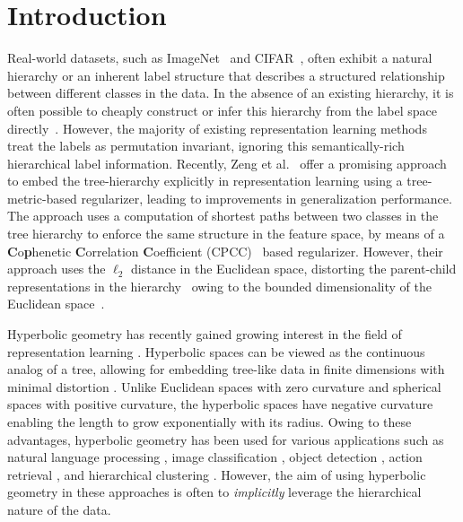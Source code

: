\section{Introduction}
\label{sec:intro} 
Real-world datasets, such as ImageNet~\citep{imagenet} and CIFAR~\citep{krizhevsky2009learning}, often exhibit a natural hierarchy or an inherent label structure that describes a structured relationship between different classes in the data. In the absence of an existing hierarchy, it is often possible to cheaply construct or infer this hierarchy from the label space directly~\citep{nauata2019structured}. However, the majority of existing representation learning methods~\citep{kolesnikov2019large, chen2020simple, wu2018unsupervised, henaff2020data, tian2020contrastive, hjelm2018learning, he2020momentum, 2020supcon} treat the labels as permutation invariant, ignoring this semantically-rich hierarchical label information. Recently, Zeng et al.~\citep{zeng2022learning} offer a promising approach to embed the tree-hierarchy explicitly in representation learning using a tree-metric-based regularizer, leading to improvements in generalization performance. The approach uses a computation of shortest paths between two classes in the tree hierarchy to enforce the same structure in the feature space, by means of a \textbf{C}o\textbf{p}henetic \textbf{C}orrelation \textbf{C}oefficient (CPCC)~\citep{cpcc} based regularizer. However, their approach uses the $\ell_2$ distance in the Euclidean space, distorting the parent-child representations in the hierarchy~\citep{ ravasz2003hierarchical, li2023euclidean} owing to the bounded dimensionality of the Euclidean space~\citep{chen2013hyperbolicity}.  

Hyperbolic geometry has recently gained growing interest in the field of representation learning \citep{nickel2017poincare,nickel2018learning}. Hyperbolic spaces can be viewed as the continuous analog of a tree, allowing for embedding tree-like data in finite dimensions with minimal distortion \citep{2010hyperbolic,sala2018representation, Sarkar_2012, gulcehre2018hyperbolic}. Unlike Euclidean spaces with zero curvature and spherical spaces with positive curvature, the hyperbolic spaces have negative curvature enabling the length to grow exponentially with its radius. Owing to these advantages, hyperbolic geometry has been used for various applications such as natural language processing \citep{liu2020hyperbolic, sala2018representation, dhingra2018embedding}, image classification \citep{khrulkov2020hyperbolic, yue2023hyperbolic, ermolov2022hyperbolic}, object detection \citep{lang2022hyperbolic, ge2022hyperbolic}, action retrieval \citep{Long_2020_CVPR}, and hierarchical clustering \citep{yan2021unsupervised}.
However, the aim of using hyperbolic geometry in these approaches is often to \emph{implicitly} leverage the hierarchical nature of the data. 

